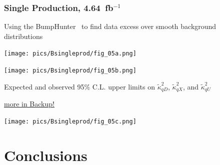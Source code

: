 \documentclass[xcolor=dvipsnames,10pt]{beamer}
\newcommand{\ifb}{~fb$^{-1}$}
\begin{document}
\begin{frame}\frametitle{Single Production, 4.64\ifb~\cite{ATLAS-CONF-2012-137}} %
\footnotesize\centering


Using the BumpHunter~\cite{2011arXiv1101.0390C} to find data excess over smooth background distributions\\

\begin{minipage}{1.\textwidth}
\begin{minipage}{.5\textwidth}\scriptsize\centering
\texttt{[image: pics/Bsingleprod/fig\_05a.png]}\\
\end{minipage}\begin{minipage}{.5\textwidth}\scriptsize\centering
\texttt{[image: pics/Bsingleprod/fig\_05b.png]}\\
\end{minipage}
\end{minipage}
\begin{minipage}{1.\textwidth}
\begin{minipage}{.5\textwidth}\scriptsize\centering

\vspace{\baselineskip}
\vspace{\baselineskip}
\vspace{\baselineskip}

Expected and observed 95\% C.L. upper limits on $\tilde{\kappa}^{2}_{qD}$, $\tilde{\kappa}^{2}_{qX}$, and $\tilde{\kappa}^{2}_{qU}$

\vspace{\baselineskip}
\vspace{\baselineskip}
\vspace{\baselineskip}

\hyperlink{Bsingleprod}{more in Backup!}

\end{minipage}\begin{minipage}{.5\textwidth}\scriptsize\centering
\texttt{[image: pics/Bsingleprod/fig\_05c.png]}\\
\end{minipage}
\end{minipage}


\end{frame}




\section{Conclusions}
\end{document}
